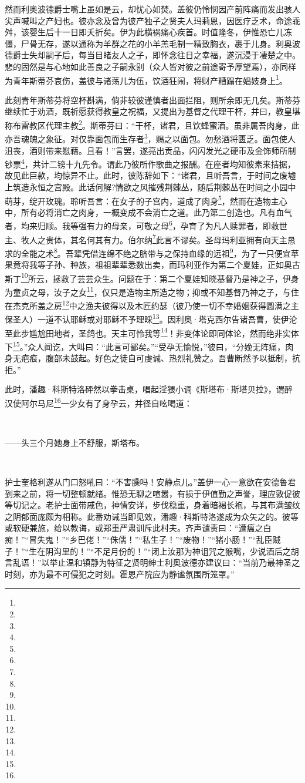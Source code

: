 \par 然而利奥波德爵士嘴上虽如是云，却忧心如焚。盖彼仍怜悯因产前阵痛而发出骇人尖声喊叫之产妇也。彼亦念及曾为彼产独子之贤夫人玛莉恩，因医疗乏术，命途乖舛，该婴生后十一日即夭折矣。伊为此横祸痛心疾首。时值隆冬，伊惟恐亡儿冻僵，尸骨无存，遂以通称为羊群之花的小羊羔毛制一精致胸衣，裹于儿身。利奥波德爵士失却嗣子后，每当目睹友人之子，即怀念往日之幸福，遂沉浸于凄楚之中。悲的固然是与心地如此善良之子嗣永别（众人皆对彼之前途寄予厚望焉），亦同样为青年斯蒂芬哀伤，盖彼与诸荡儿为伍，饮酒狂闹，将财产糟蹋在娼妓身上\footnote{}。
\par 此刻青年斯蒂芬将空杯斟满，倘非较彼谨慎者出面拦阻，则所余即无几矣。斯蒂芬继续忙于劝酒，既祈愿获得教皇之祝福，又提出为基督之代理干杯，并曰，教皇堪称布雷教区代理主教\footnote{}。斯蒂芬曰：“干杯，诸君，且饮蜂蜜酒。虽非属吾肉身，此亦吾魂魄之象征。对仅靠面包而生存者\footnote{}，赐之以面包。勿愁酒将匮乏。面包使人沮丧，酒则带来慰藉。且看！”言罢，遂亮出贡品，闪闪发光之硬币及金饰师所制钞票\footnote{}，共计二镑十九先令。谓此乃彼所作歌曲之报酬。在座者均知彼素来拮据，故见此巨款，均惊异不止。此时，彼陈辞如下：“诸君，且听吾言，于时间之废墟上筑造永恒之宫殿。此话何解?情欲之风摧残荆棘丛，随后荆棘丛在时间之小园中萌芽，绽开玫瑰。聆听吾言：在女子的子宫内，道成了肉身\footnote{}，然而在造物主心中，所有必将消亡之肉身，一概变成不会消亡之道。此乃第二创造也。凡有血气者，均来归顺。我等强有力的母亲，可敬之母\footnote{}，孕育了为凡人赎罪者，即救世主、牧人之贵体，其名何其有力。伯尔纳\footnote{}此言不谬矣。圣母玛利亚拥有向天主恳求的全能之术\footnote{}。吾辈凭借连绵不绝之脐带与之保持血缘的远祖\footnote{}，为了一只便宜苹果竟将我等子孙、种族，祖祖辈辈悉数出卖，而玛利亚作为第二个夏娃，正如奥古斯丁\footnote{}所云，拯救了芸芸众生。问题在于：第二个夏娃知晓基督乃是神之子，伊身为童贞之母，汝子之女\footnote{}，仅只是造物主所造之物；抑或不知基督乃神之子，与住在杰克所盖之房\footnote{}中之渔夫彼得以及木匠约瑟（彼乃使一切不幸婚姻获得圆满之主保圣人）一道不认耶稣或对耶稣不予理睬\footnote{}。因利奥·塔克西尔告诸吾曹，使伊沦至此步尴尬田地者，圣鸽也。天主可怜我等\footnote{}！非变体论即同体论，然而绝非实体下\footnote{}。”众人闻讫，大叫曰：“此言可鄙矣。”“受孕无愉悦，”彼曰，“分娩无阵痛，肉身无疤痕，腹部未鼓起。好色之徒自可虔诚、热烈礼赞之。吾曹断然予以抵制，抗拒。”
\par 此时，潘趣·科斯特洛砰然以拳击桌，唱起淫猥小调《斯塔布·斯塔贝拉》，谓醉汉使阿尔马尼\footnote{}一少女有了身孕云，并径自吆喝道：
\par  
\par ——头三个月她身上不舒服，斯塔布。
\par  
\par 护士奎格利遂从门口怒吼曰：“不害臊吗！安静点儿。”盖伊一心一意欲在安德鲁君到来之前，将一切整顿就绪。惟恐无聊之喧嚣，有损于伊值勤之声誉，理应敦促彼等切记之。老护士面带戚色，神情安详，步伐稳重，身着暗褐长袍，与其布满皱纹之阴郁面庞颇为相称。此番劝诫当即见效，潘趣·科斯特洛遂成为众矢之的。彼等或软硬兼施，给以教诲，或郑重严肃训斥此村夫。齐声谴责曰：“遭瘟之白痴！”“冒失鬼！”“乡巴佬！”“侏儒！”“私生子！”“废物！”“猪小肠！”“乱臣贼子！”“生在阴沟里的！”“不足月份的！”“闭上汝那为神诅咒之猴嘴，少说酒后之胡言乱语！”以举止温和镇静为特征之贤明绅士利奥波德亦建议曰：“当前乃最神圣之时刻，亦为最不可侵犯之时刻。霍恩产院应为静谧氛围所笼罩。”
